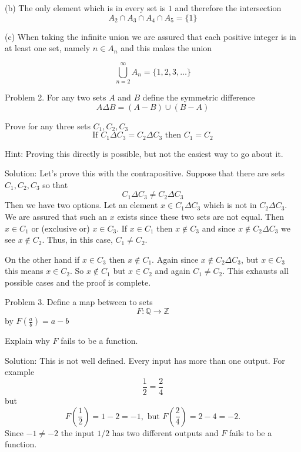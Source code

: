 \documentclass[16 pt]{amsart}
\theoremstyle{definition}
\theoremstyle{remark}
\numberwithin{equation}{subsection}
\newcommand{\Z}{\mathbb{Z}}
\newcommand{\Q}{\mathbb{Q}}
\begin{document}
(b) The only element which is in every set is $1$ and therefore the intersection 
\[
A_2\cap A_3 \cap A_4 \cap A_5 = \{1\}
\]

(c) When taking the infinite union we are assured that each positive integer is in at least one set, namely $n\in A_n$ and this makes the union

\[
\bigcup_{n=2}^{\infty} A_n = \{1,2,3,\dots\}
\]

\newpage

Problem 2. For any two sets $A$ and $B$ define the symmetric difference 
\[
A \Delta B = (A- B)\cup(B- A)
\]

Prove for any three sets $C_1,C_2,C_3$ 
\[
\text{If } C_1\Delta C_3 = C_2\Delta C_3 \text{ then } C_1 = C_2
\]

Hint: Proving this directly is possible, but not the easiest way to go about it.


\vspace{1in}

Solution: Let's prove this with the contrapositive.
Suppose that there are sets $C_1,C_2,C_3$ so that
\[
C_1\Delta C_3 \ne C_2 \Delta C_3
\]
Then we have two options.  Let an element $x\in C_1\Delta C_3$ which is not in $C_2\Delta C_3$.  We are assured that such an $x$ exists since these two sets are not equal.  Then $x\in C_1$ or (exclusive or) $x\in C_3$.
If $x\in C_1$ then $x\notin C_3$ and since $x\notin C_2\Delta C_3$ we see $x\notin C_2$.  Thus, in this case, $C_1\ne C_2$.

On the other hand if $x\in C_3$ then $x\notin C_1$.  Again since $x\notin C_2\Delta C_3$, but $x\in C_3$ this means $x\in C_2$.  So $x\notin C_1$ but $x\in C_2$ and again $C_1\ne C_2$.  This exhausts all possible cases and the proof is complete.

\newpage

Problem 3. Define a map between to sets
\[
F : \Q \rightarrow \Z 
\]
by $F(\frac{a}{b}) = a-b$ 

Explain why $F$ fails to be a function.



\vspace{1in}

Solution: This is not well defined.  Every input has more than one output.  For example
\[
\frac{1}{2} = \frac{2}{4}
\]
but
\[
F(\frac{1}{2}) = 1-2 = -1, \text{ but } F(\frac{2}{4})= 2-4 = -2.
\]
Since $-1\ne -2$ the input $1/2$ has two different outputs and $F$ fails to be a function.


\newpage
\end{document}
